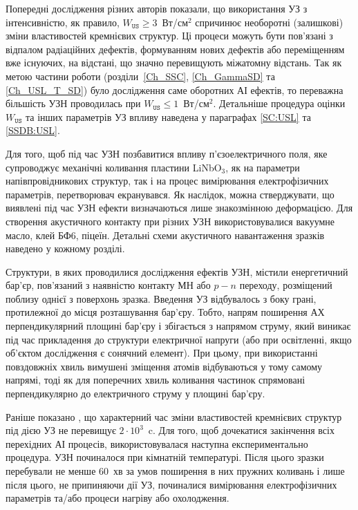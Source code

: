 Попередні дослідження різних авторів \cite{Davletova2008,Davletova2009,Pashaev2014r,Vlasov2009r} показали, що використання УЗ
з інтенсивністю, як правило, $W_\mathtt{US}\geq3$~Вт/см$^2$ спричинює необоротні (залишкові) зміни властивостей кремнієвих структур.
Ці процеси можуть бути пов'язані з відпалом радіаційних дефектів, формуванням нових дефектів або переміщенням вже існуючих, на відстані, що значно перевищують міжатомну відстань.
Так як метою частини роботи (розділи~\ref{Ch_SSC}, \ref{Ch_GammaSD} та \ref{Ch_USL_T_SD}) було дослідження саме оборотних АІ ефектів,
то переважна більшість УЗН проводилась при $W_\mathtt{US} \leq 1$~Вт/см$^2$.
Детальніше процедура оцінки $W_\mathtt{US}$ та інших параметрів УЗ впливу наведена у параграфах \ref{SC:USL} та \ref{SSDB:USL}.

Для того, щоб під час УЗН позбавитися впливу п'єзоелектричного поля, яке супроводжує механічні коливання пластини LiNbO$_3$,  як на параметри напівпровідникових структур, так і на процес вимірювання електрофізичних параметрів,
перетворювач екранувався.
Як наслідок, можна стверджувати, що виявлені під час УЗН ефекти визначаються лише знакозмінною деформацією.
Для створення акустичного контакту при різних УЗН використовувалися вакуумне масло, клей БФ6, піцеїн.
Детальні схеми акустичного навантаження зразків наведено у кожному розділі.


Структури, в яких проводилися дослідження ефектів УЗН, містили енергетичний бар'єр, пов'язаний з наявністю контакту МН або $p-n$ переходу, розміщений поблизу однієї з поверхонь зразка.
Введення УЗ відбувалось з боку грані, протилежної до місця розташування бар'єру.
Тобто, напрям поширення АХ перпендикулярний площині бар'єру і збігається з напрямом струму, який виникає під час прикладення до структури електричної напруги (або при освітленні, якщо об'єктом дослідження є сонячний елемент).
При цьому, при використанні повздовжніх хвиль вимушені зміщення атомів відбуваються у тому самому напрямі, тоді як для поперечних хвиль коливання частинок спрямовані перпендикулярно до електричного струму у площині бар'єру.

Раніше показано \cite{Ostapenko1995,YOlikhTPL2011,Ostrovskii2001}, що характерний час зміни властивостей кремнієвих структур під дією УЗ не перевищує $2\cdot10^3$~c.
Для того, щоб дочекатися закінчення всіх перехідних АІ процесів, використовувалася наступна експериментально процедура.
УЗН починалося при кімнатній температурі.
Після цього зразки перебували не менше 60~хв за умов поширення в них пружних коливань і лише після цього, не припиняючи дії УЗ, починалися вимірювання електрофізичних параметрів та/або процеси нагріву або охолодження.


